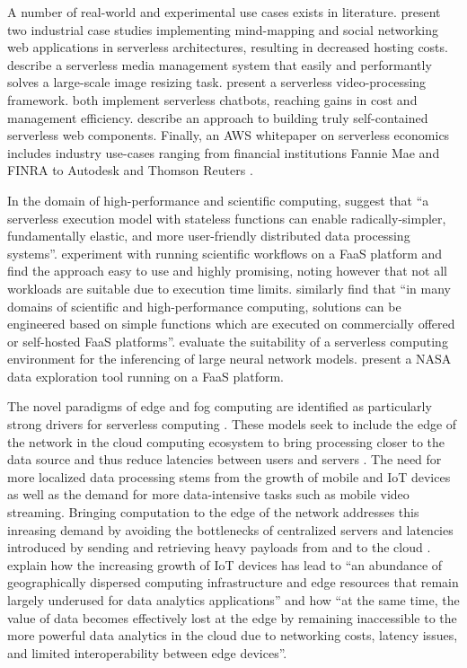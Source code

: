 A number of real-world and experimental use cases exists in literature. \textcite{adzic2017serverless} present two industrial case studies implementing mind-mapping and social networking web applications in serverless architectures, resulting in decreased hosting costs. \textcite{mcgrath16cloudEventParadigms} describe a serverless media management system that easily and performantly solves a large-scale image resizing task. \textcite{fouladi2017encoding} present a serverless video-processing framework. \textcite{yan16chatbot,lehva18chatbot} both implement serverless chatbots, reaching gains in cost and management efficiency. \textcite{ast17webcomponent} describe an approach to building truly self-contained serverless web components. Finally, an AWS whitepaper on serverless economics includes industry use-cases ranging from financial institutions Fannie Mae and FINRA to Autodesk and Thomson Reuters \parencite{aws17economics}.

In the domain of high-performance and scientific computing, \textcite{jonas17occupy} suggest that ``a serverless execution model with stateless functions can enable radically-simpler, fundamentally elastic, and more user-friendly distributed data processing systems''. \textcite{malawski17executescientific} experiment with running scientific workflows on a FaaS platform and find the approach easy to use and highly promising, noting however that not all workloads are suitable due to execution time limits. \textcite{spillner18faaster} similarly find that ``in many domains of scientific and high-performance computing, solutions can be engineered based on simple functions which are executed on commercially offered or self-hosted FaaS platforms''. \textcite{ishakian17neural} evaluate the suitability of a serverless computing environment for the inferencing of large neural network models. \textcite{petrenko17nasa} present a NASA data exploration tool running on a FaaS platform.

The novel paradigms of edge and fog computing are identified as particularly strong drivers for serverless computing \parencite{fox17}. These models seek to include the edge of the network in the cloud computing ecosystem to bring processing closer to the data source and thus reduce latencies between users and servers \parencite{buyya2017manifesto}. The need for more localized data processing stems from the growth of mobile and IoT devices as well as the demand for more data-intensive tasks such as mobile video streaming. Bringing computation to the edge of the network addresses this inreasing demand by avoiding the bottlenecks of centralized servers and latencies introduced by sending and retrieving heavy payloads from and to the cloud \parencite{baresi17edgecomputing}. \textcite{nastic17analyticsedge} explain how the increasing growth of IoT devices has lead to ``an abundance of geographically dispersed computing infrastructure and edge resources that remain largely underused for data analytics applications'' and how ``at the same time, the value of data becomes effectively lost at the edge by remaining inaccessible to the more powerful data analytics in the cloud due to networking costs, latency issues, and limited interoperability between edge devices''.

